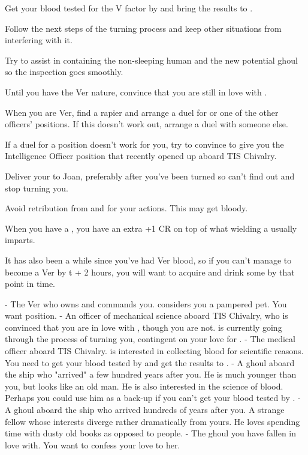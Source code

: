 \documentclass[char]{guildcamp4}
\begin{document}
\begin{itemz}[Goals]
	\item Get your blood tested for the V factor by \cVthree{} and bring the results to \cVtwo{}.
	\item Follow the next steps of the turning process and keep other situations from interfering with it.
	\item Try to assist in containing the non-sleeping human and the new potential ghoul so the inspection goes smoothly.
	\item Until you have the Ver nature, convince \cVtwo{} that you are still in love with \cVtwo{\them}.
	\item When you are Ver, find a rapier and arrange a duel for \cVone{} or one of the other officers' positions. If this doesn't work out, arrange a duel with someone else.
	\item If a duel for a position doesn't work for you, try to convince \cVone{} to give you the Intelligence Officer position that recently opened up aboard TIS Chivalry.
	\item Deliver your \iLoveLetter{} to Joan, preferably after you've been turned so \cVtwo{} can't find out and stop turning you.
	\item Avoid retribution from \cVone{} and \cVtwo{} for your actions. This may get bloody.
\end{itemz} 

\begin{itemz}[Notes]
	\item When you have a \iRapier{}, you have an extra +1 CR on top of what wielding a \iRapier{} usually imparts.
	\item It has also been a while since you've had Ver blood, so if you can't manage to become a Ver by t + 2 hours, you will want to acquire and drink some by that point in time.
\end{itemz}

\begin{contacts}
	\contact{\cVone{}} - The Ver who owns and commands you. \cVone{\they} considers you a pampered pet. You want \cVone{\their} position.
	\contact{\cVtwo{}} - An officer of mechanical science aboard TIS Chivalry, who is convinced that you are in love with \cVtwo{\them}, though you are not. \cVtwo{} is currently going through the process of turning you, contingent on your love for \cVtwo{\them}.
	\contact{\cVthree{}} - The medical officer aboard TIS Chivalry. \cVthree{\They} is interested in collecting blood for scientific reasons. You need to get your blood tested by \cVthree{\them} and get the results to \cVtwo{}.
	\contact{\cJames{}} - A ghoul aboard the ship who "arrived" a few hundred years after you. He is much younger than you, but looks like an old man. He is also interested in the science of blood. Perhaps you could use him as a back-up if you can't get your blood tested by \cVthree{}.
	\contact{\cRasputin{}} - A ghoul aboard the ship who arrived hundreds of years after you. A strange fellow whose interests diverge rather dramatically from yours. He loves spending time with dusty old books as opposed to people.
	\contact{\cJoan{}} - The ghoul you have fallen in love with. You want to confess your love to her. 
\end{contacts}
\end{document}
